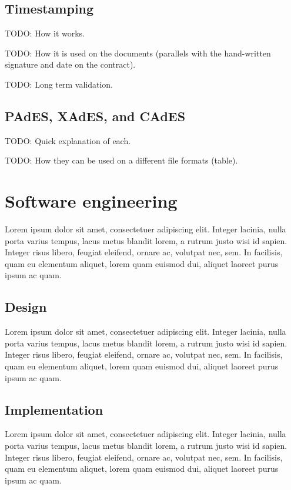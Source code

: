 \documentclass[thesismargins, english, thesislinespacing, twoside, openright, upjsfrontpage]{rnthesis}
\begin{document}
\subsection{Timestamping}

TODO: How it works.

TODO: How it is used on the documents (parallels with the hand-written signature and date on the contract).

TODO: Long term validation.

\subsection{PAdES, XAdES, and CAdES}

TODO: Quick explanation of each.

TODO: How they can be used on a different file formats (table).

\section{Software engineering}

Lorem ipsum dolor sit amet, consectetuer adipiscing elit.
Integer lacinia, nulla porta varius tempus, lacus metus blandit
lorem, a rutrum justo wisi id sapien. Integer risus libero,
feugiat eleifend, ornare ac, volutpat nec, sem. In facilisis,
quam eu elementum aliquet, lorem quam euismod dui, aliquet
laoreet purus ipsum ac quam.

\subsection{Design}

Lorem ipsum dolor sit amet, consectetuer adipiscing elit.
Integer lacinia, nulla porta varius tempus, lacus metus blandit
lorem, a rutrum justo wisi id sapien. Integer risus libero,
feugiat eleifend, ornare ac, volutpat nec, sem. In facilisis,
quam eu elementum aliquet, lorem quam euismod dui, aliquet
laoreet purus ipsum ac quam.

\subsection{Implementation}

Lorem ipsum dolor sit amet, consectetuer adipiscing elit.
Integer lacinia, nulla porta varius tempus, lacus metus blandit
lorem, a rutrum justo wisi id sapien. Integer risus libero,
feugiat eleifend, ornare ac, volutpat nec, sem. In facilisis,
quam eu elementum aliquet, lorem quam euismod dui, aliquet
laoreet purus ipsum ac quam.
\end{document}
